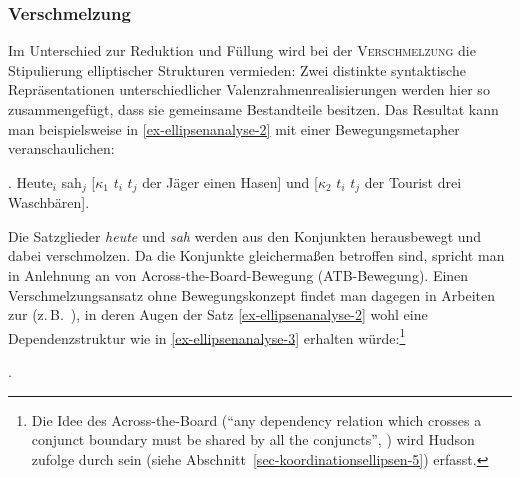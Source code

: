 \subsubsection*{Verschmelzung}

Im Unterschied zur Reduktion und Füllung wird bei der \textsc{Verschmelzung} die Stipulierung elliptischer Strukturen vermieden: Zwei distinkte syntaktische Repräsentationen unterschiedlicher Valenzrahmenrealisierungen werden hier so zusammengefügt, dass sie gemeinsame Bestandteile besitzen. Das Resultat kann man beispielsweise in \ref{ex-ellipsenanalyse-2} mit einer Bewegungsmetapher veranschaulichen: 

\ex. \label{ex-ellipsenanalyse-2} Heute$_i$ sah$_j$ [$\kappa_1$ $t_i$ $t_j$ der Jäger einen Hasen] und [$\kappa_2$ $t_i$ $t_j$ der Tourist drei Waschbären]. 

Die Satzglieder {\it heute} und {\it sah} werden aus den Konjunkten herausbewegt und dabei verschmolzen. Da die Konjunkte gleicherma\ss en betroffen sind, spricht man in Anlehnung an \cite{Williams:78,Williams:81} von Across-the-Board-Bewegung (ATB-Bewegung). Einen Verschmelzungsansatz ohne Bewegungskonzept findet man dagegen in Arbeiten zur  (z.\,B.\ \citealt{Hudson:88,Pickering:Barry:93}), in deren Augen der Satz \ref{ex-ellipsenanalyse-2} wohl eine Dependenzstruktur wie in \ref{ex-ellipsenanalyse-3} erhalten würde:\footnote{Die Idee des Across-the-Board ("`any dependency relation which crosses a conjunct boundary must be shared by all the conjuncts"', \citealt[323]{Hudson:88}) wird Hudson zufolge durch sein  (siehe Abschnitt~\ref{sec-koordinationsellipsen-5}) erfasst.}

\vspace{6ex}

\ex. 

